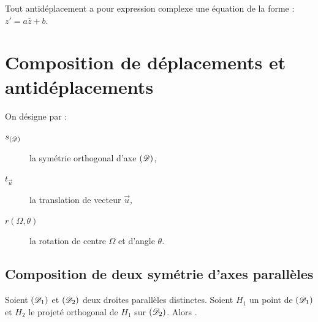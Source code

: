       \begin{prop}
	            Tout antid\'eplacement a pour expression complexe une \'equation de la forme :
                  $z' = a\bar{z} + b$.
      \end{prop}
      
%
\section{Composition de d\'eplacements et antid\'eplacements}
      On d\'esigne par :
      \begin{description}
            \item[$s_{(\mathscr{D})}$] la sym\'etrie orthogonal d'axe $(\mathscr{D})$,
            \item[$t_{\vec{u}}$] la translation de vecteur $\vec{u}$,
            \item[$r(\Omega,\theta)$] la rotation de centre $\Omega$ et d'angle $\theta$.
      \end{description}
      \subsection{Composition de deux sym\'etrie d'axes parall\`eles}
            Soient $(\mathscr{D}_1)$ et $(\mathscr{D}_2)$ deux droites parall\`eles distinctes.
            Soient $H_1$ un point de $(\mathscr{D}_1)$ et $H_2$ le projet\'e orthogonal de $H_1$ sur $(\mathscr{D}_2)$.
            Alors .
            
